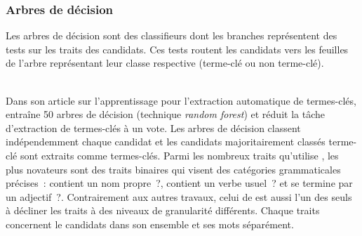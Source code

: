       \subsubsection{Arbres de décision}
      \label{subsubsec:main-state_of_the_art-automatic_keyphrase_extraction-supervised_keyphrase_extraction-decision_trees}
        Les arbres de décision sont des classifieurs dont les branches
        représentent des tests sur les
        traits des candidats. Ces tests routent les candidats
        vers les feuilles de l'arbre représentant leur classe respective
        (\og{}terme-clé\fg{} ou \og{}non terme-clé\fg{}).

        ~\\Dans son article sur l'apprentissage pour l'extraction automatique de
        termes-clés,  entraîne 50 arbres
        de décision (technique \textit{random forest}) et réduit la tâche
        d'extraction de termes-clés à un vote. Les arbres de décision classent
        indépendemment chaque candidat et les candidats majoritairement
        classés \og{}terme-clé\fg{} sont extraits comme termes-clés. Parmi les
        nombreux traits qu'utilise , les
        plus novateurs sont des traits binaires qui visent des catégories
        grammaticales précises~: \og{}contient un nom propre~?\fg{},
        \og{}contient un verbe usuel~?\fg{} et \og{}se termine par un
        adjectif~?\fg{}. Contrairement aux autres travaux, celui de
         est aussi l'un des seuls à
        décliner les traits à des niveaux de granularité différents. Chaque
        traits concernent le candidats dans son ensemble et ses mots séparément.

